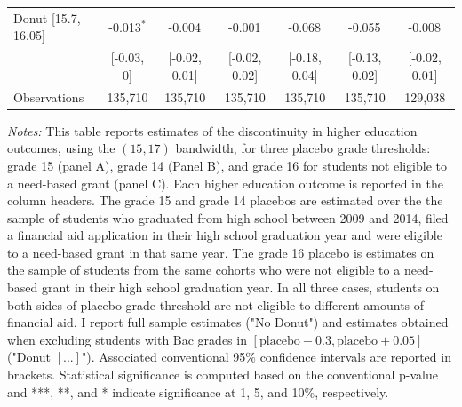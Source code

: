 \begin{table}[H]
{\begin{threeparttable}
\begin{tabular}[t]{lcccccc}
\hspace{1em}Donut [15.7, 16.05] & -0.013$^{*}$ & -0.004$^{}$ & -0.001$^{}$ & -0.068$^{}$ & -0.055$^{}$ & -0.008$^{}$\\
\hspace{1em} & {}[-0.03, 0] & {}[-0.02, 0.01] & {}[-0.02, 0.02] & {}[-0.18, 0.04] & {}[-0.13, 0.02] & {}[-0.02, 0.01]\\
\hspace{1em}Observations & 135,710 & 135,710 & 135,710 & 135,710 & 135,710 & 129,038\\
\bottomrule
\end{tabular}
\begin{tablenotes}
\item \textit{Notes:} This table reports estimates of the discontinuity in higher education outcomes, using the $(15, 17)$ bandwidth, for three placebo grade thresholds: grade 15 (panel A), grade 14 (Panel B), and grade 16 for students not eligible to a need-based grant (panel C). Each higher education outcome is reported in the column headers. The grade 15 and grade 14 placebos are estimated over the the sample of students who graduated from high school between 2009 and 2014, filed a financial aid application in their high school graduation year and were eligible to a need-based grant in that same year. The grade 16 placebo is estimates on the sample of students from the same cohorts who were not eligible to a need-based grant in their high school graduation year. In all three cases, students on both sides of placebo grade threshold are not eligible to different amounts of financial aid. I report full sample estimates ("No Donut") and estimates obtained when excluding students with Bac grades in $[\text{placebo} - 0.3, \text{placebo} + 0.05]$ ("Donut $[...]$"). Associated conventional 95\% confidence intervals are reported in brackets. Statistical significance is computed based on the conventional p-value and ***, **, and * indicate significance at 1, 5, and 10\%, respectively.
\end{tablenotes}
\end{threeparttable}}
\end{table}
